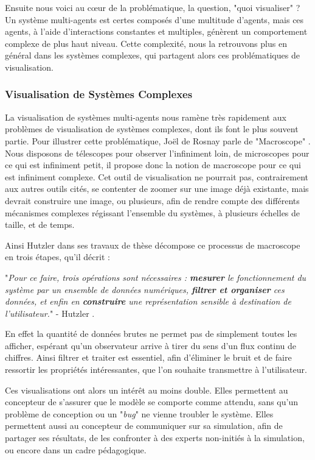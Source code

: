 		Ensuite nous voici au cœur de la problématique, la question, "quoi visualiser" ? Un système multi-agents est certes composés d'une multitude d'agents, mais ces agents, à l'aide d'interactions constantes et multiples, génèrent un comportement complexe de plus haut niveau. Cette complexité, nous la retrouvons plus en général dans les systèmes complexes, qui partagent alors ces problématiques de visualisation.
		
		\subsubsection{Visualisation de Systèmes Complexes}
		
		La visualisation de systèmes multi-agents nous ramène très rapidement aux problèmes de visualisation de systèmes complexes, dont ils font le plus souvent partie. Pour illustrer cette problématique, Joël de Rosnay parle de "Macroscope" \cite{de_rosnay_macroscope_1975}. Nous disposons de télescopes pour observer l'infiniment loin, de microscopes pour ce qui est infiniment petit, il propose donc la notion de macroscope pour ce qui est infiniment complexe. Cet outil de visualisation ne pourrait pas, contrairement aux autres outils cités, se contenter de zoomer sur une image déjà existante, mais devrait construire une image, ou plusieurs, afin de rendre compte des différents mécanismes complexes régissant l'ensemble du systèmes, à plusieurs échelles de taille, et de temps.
		
		Ainsi Hutzler dans ses travaux de thèse \cite{hutzler_du_2000} décompose ce processus de macroscope en trois étapes, qu'il décrit :
		
		"\textit{Pour ce faire, trois opérations sont nécessaires : \textbf{mesurer} le fonctionnement du système par un ensemble de données numériques, \textbf{filtrer et organiser} ces données, et enfin en \textbf{construire} une représentation sensible à destination de l'utilisateur.}" - Hutzler \cite{hutzler_du_2000}.

	En effet la quantité de données brutes ne permet pas de simplement toutes les afficher, espérant qu'un observateur arrive à tirer du sens d'un flux continu de chiffres. Ainsi filtrer et traiter est essentiel, afin d'éliminer le bruit et de faire ressortir les propriétés intéressantes, que l'on souhaite transmettre à l'utilisateur.

		
		 Ces visualisations ont alors un intérêt au moins double. Elles permettent au concepteur de s'assurer que le modèle se comporte comme attendu, sans qu'un problème de conception ou un "\textit{bug}" ne vienne troubler le système. Elles permettent aussi au concepteur de communiquer sur sa simulation, afin de partager ses résultats, de les confronter à des experts non-initiés à la simulation, ou encore dans un cadre pédagogique.

